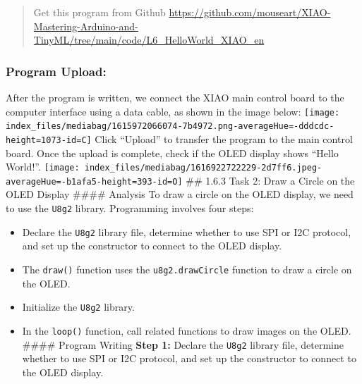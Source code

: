 \documentclass[
  letterpaper,
  DIV=11,
  numbers=noendperiod]{scrreprt}
\providecommand{\tightlist}{%
  \setlength{\itemsep}{0pt}\setlength{\parskip}{0pt}}\usepackage{longtable,booktabs,array}
\begin{document}
\begin{quote}
Get this program from Github
\url{https://github.com/mouseart/XIAO-Mastering-Arduino-and-TinyML/tree/main/code/L6_HelloWorld_XIAO_en}
\end{quote}

\hypertarget{program-upload}{%
\subsubsection*{Program Upload:}\label{program-upload}}

After the program is written, we connect the XIAO main control board to
the computer interface using a data cable, as shown in the image below:
\texttt{[image: index\_files/mediabag/1615972066074-7b4972.png-averageHue=-dddcdc-height=1073-id=C]}
Click ``Upload'' to transfer the program to the main control board. Once
the upload is complete, check if the OLED display shows ``Hello
World!''.
\texttt{[image: index\_files/mediabag/1616922722229-2d7ff6.jpeg-averageHue=-b1afa5-height=393-id=O]}
\#\# 1.6.3 Task 2: Draw a Circle on the OLED Display \#\#\#\# Analysis
To draw a circle on the OLED display, we need to use the \texttt{U8g2}
library. Programming involves four steps:

\begin{itemize}
\tightlist
\item
  Declare the \texttt{U8g2} library file, determine whether to use SPI
  or I2C protocol, and set up the constructor to connect to the OLED
  display.
\item
  The \texttt{draw()} function uses the \texttt{u8g2.drawCircle}
  function to draw a circle on the OLED.
\item
  Initialize the \texttt{U8g2} library.
\item
  In the \texttt{loop()} function, call related functions to draw images
  on the OLED. \#\#\#\# Program Writing \textbf{Step 1:} Declare the
  \texttt{U8g2} library file, determine whether to use SPI or I2C
  protocol, and set up the constructor to connect to the OLED display.
\end{itemize}
\end{document}
